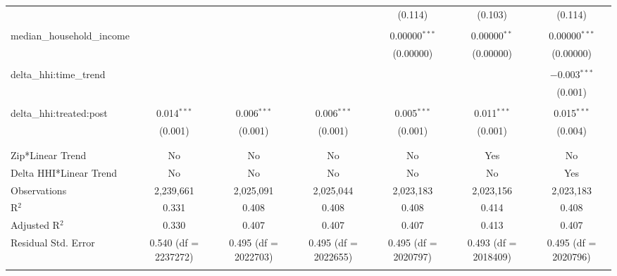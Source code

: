 \begin{table}[H]
{\begin{tabular}{@{\extracolsep{5pt}}lcccccc}
   &  &  &  & (0.114) & (0.103) & (0.114) \\  

   & & & & & & \\  

  median\_household\_income &  &  &  & 0.00000$^{***}$ & 0.00000$^{**}$ & 0.00000$^{***}$ \\  

   &  &  &  & (0.00000) & (0.00000) & (0.00000) \\  

   & & & & & & \\  

  delta\_hhi:time\_trend &  &  &  &  &  & $-$0.003$^{***}$ \\  

   &  &  &  &  &  & (0.001) \\  

   & & & & & & \\  

  delta\_hhi:treated:post & 0.014$^{***}$ & 0.006$^{***}$ & 0.006$^{***}$ & 0.005$^{***}$ & 0.011$^{***}$ & 0.015$^{***}$ \\  

   & (0.001) & (0.001) & (0.001) & (0.001) & (0.001) & (0.004) \\  

   & & & & & & \\  

 \hline \\[-1.8ex]  

 Zip*Linear Trend & No & No & No & No & Yes & No \\  

 Delta HHI*Linear Trend & No & No & No & No & No & Yes \\  

 Observations & 2,239,661 & 2,025,091 & 2,025,044 & 2,023,183 & 2,023,156 & 2,023,183 \\  

 R$^{2}$ & 0.331 & 0.408 & 0.408 & 0.408 & 0.414 & 0.408 \\  

 Adjusted R$^{2}$ & 0.330 & 0.407 & 0.407 & 0.407 & 0.413 & 0.407 \\  

 Residual Std. Error & 0.540 (df = 2237272) & 0.495 (df = 2022703) & 0.495 (df = 2022655) & 0.495 (df = 2020797) & 0.493 (df = 2018409) & 0.495 (df = 2020796) \\  

 \hline  

 \hline \\[-1.8ex]  


\end{tabular}}
\end{table}
